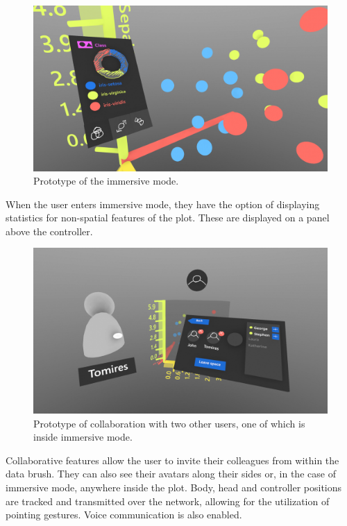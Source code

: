 \documentclass[thesis=M,english,hidelinks]{FITthesisXE}[2012/06/26]
\begin{document}
\begin{figure}[ht]
\centering
\includegraphics[scale=0.15]{maquette_statistics}
\caption{Prototype of the immersive mode.}
\label{fig:maquette_statistics}
\end{figure}

When the user enters immersive mode, they have the option of displaying statistics for non-spatial features of the plot. These are displayed on a panel above the controller.

\begin{figure}[ht]
\centering
\includegraphics[scale=0.15]{maquette_collaboration}
\caption{Prototype of collaboration with two other users, one of which is inside immersive mode.}
\label{fig:maquette_collaboration}
\end{figure}

Collaborative features allow the user to invite their colleagues from within the data brush. They can also see their avatars along their sides or, in the case of immersive mode, anywhere inside the plot. Body, head and controller positions are tracked and transmitted over the network, allowing for the utilization of pointing gestures. Voice communication is also enabled.
\end{document}
